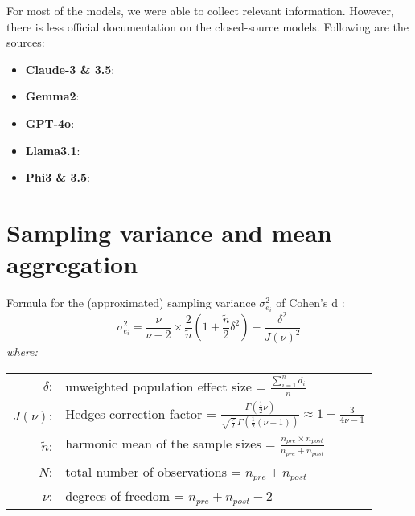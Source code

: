\par For most of the models, we were able to collect relevant information. However, there is less official documentation on the closed-source models. Following are the sources:
\begin{itemize}
    \item \textbf{Claude-3 \& 3.5}: \textcite{anthropic2024claude, anthropic2024claude2, decoder2024claudeassistant, felloai2024claudeai, neoteric2024claude3_5}
    \item \textbf{Gemma2}: \textcite{team2024gemma}
    \item \textbf{GPT-4o}: \textcite{explodingtopics2024gptparameters, furia2024gpt4o, openai2024gpt4o, openai2024gpt4omini, yub2024gpt4o}
    \item \textbf{Llama3.1}: \textcite{dubey2024llama, huggingface2024llama3_1_8b, meta2024llama31}
    \item \textbf{Phi3 \& 3.5}: \textcite{abdin2024phi, huggingface2024phi3_medium, huggingface2024phi3_5_mini}
\end{itemize}

\newpage
\section{Sampling variance and mean aggregation}
\label{appendix:samplingvar_mean}

\par Formula for the (approximated) sampling variance $\sigma^2_{e_{i}}$ of Cohen's d \parencite{borenstein2021introduction, goulet2018review, morris2002combining}:
\begin{equation} \label{eq:variance_sampling}
    \sigma^2_{e_{i}} = \frac{\nu}{\nu - 2} \times \frac{2}{\tilde{n}} \left( 1 + \frac{\tilde{n}}{2} \delta^2 \right) - \frac{\delta^2}{J(\nu)^2}
\end{equation}
\hspace{0.5cm} \textit{where:} \\
\hspace*{3em}
\begin{tabular}{rl}
    $\delta$:& unweighted population effect size = $\frac{\sum_{i=1}^{n} d_{i}}{n}$ \\
    $J(\nu)$:& Hedges correction factor = $\frac{\Gamma\left(\frac{1}{2} \nu\right)}{\sqrt{\frac{\nu}{2}} \, \Gamma\left(\frac{1}{2} (\nu - 1)\right)} \approx 1 - \frac{3}{4 \nu - 1}$ \parencite{hedges1981distribution} \\
    $\tilde{n}$:& harmonic mean of the sample sizes = $\frac{n_{pre} \times n_{post}}{n_{pre} + n_{post}}$ \\
    $N$:& total number of observations = $n_{pre} + n_{post}$ \\
    $\nu$:& degrees of freedom = $n_{pre} + n_{post} - 2$ \\
\end{tabular} \\

